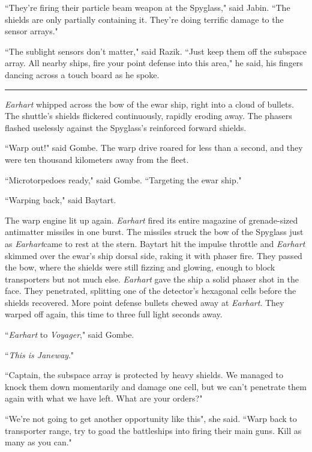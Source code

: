 \documentclass[twoside,letterpaper,12pt]{memoir}
\begin{document}
``They're firing their particle beam weapon at the Spyglass," said Jabin. ``The shields are only partially containing it. They're doing terrific damage to the sensor arrays."

``The sublight sensors don't matter," said Razik. ``Just keep them off the subspace array. All nearby ships, fire your point defense into this area," he said, his fingers dancing across a touch board as he spoke.

\begin{center}\rule{3cm}{0.4 pt}\end{center}

\textit{Earhart} whipped across the bow of the ewar ship, right into a cloud of bullets. The shuttle's shields flickered continuously, rapidly eroding away. The phasers flashed uselessly against the Spyglass's reinforced forward shields.

``Warp out!" said Gombe. The warp drive roared for less than a second, and they were ten thousand kilometers away from the fleet.

``Microtorpedoes ready," said Gombe. ``Targeting the ewar ship."

``Warping back," said Baytart.

The warp engine lit up again. \textit{Earhart} fired its entire magazine of grenade-sized antimatter missiles in one burst. The missiles struck the bow of the Spyglass just as \textit{Earhart}came to rest at the stern. Baytart hit the impulse throttle and \textit{Earhart} skimmed over the ewar's ship dorsal side, raking it with phaser fire. They passed the bow, where the shields were still fizzing and glowing, enough to block transporters but not much else. \textit{Earhart} gave the ship a solid phaser shot in the face. They penetrated, splitting one of the detector's hexagonal cells before the shields recovered. More point defense bullets chewed away at \textit{Earhart}. They warped off again, this time to three full light seconds away.

``\textit{Earhart} to \textit{Voyager}," said Gombe.

``\textit{This is Janeway}."

``Captain, the subspace array is protected by heavy shields. We managed to knock them down momentarily and damage one cell, but we can't penetrate them again with what we have left. What are your orders?"

``We're not going to get another opportunity like this", she said. ``Warp back to transporter range, try to goad the battleships into firing their main guns. Kill as many as you can."
\end{document}
